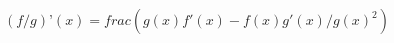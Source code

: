 \documentclass[preview]{standalone}
\begin{document}
\begin{align*}
(f/g)’(x) = frac({g(x)f'(x) - f(x)g'(x)}/{g(x)^2})
\end{align*}
\end{document}
